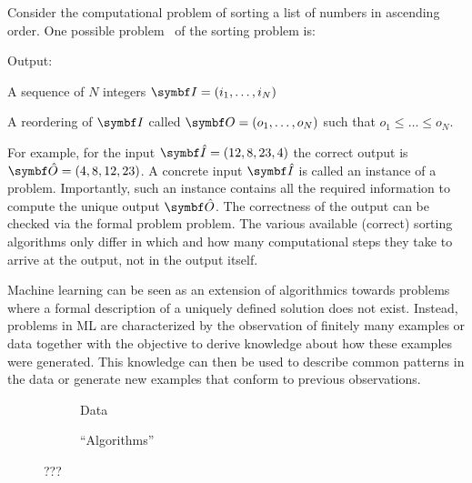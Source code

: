 Consider the computational problem of sorting a list of numbers in ascending order.
One possible problem~\parencite{cormen_introduction_2009} of the sorting problem is:
\begin{problem}[Sorting]
\label{prob:bayesian_ml:sorting}
\begin{labeling}{Output:}
    \item[Input:] A sequence of $N$ integers $\mat{I} = (i_1, \dots, i_N)$
    \item[Output:] A reordering of $\mat{I}$ called $\mat{O} = (o_1, \dots, o_N)$ such that $o_1 \leq \dots \leq o_N$.
\end{labeling}
\end{problem}
For example, for the input $\mat{\hat{I}}=(12, 8, 23, 4)$ the correct output is $\mat{\hat{O}}=(4, 8, 12, 23)$.
A concrete input $\mat{\hat{I}}$ is called an instance of a problem.
Importantly, such an instance contains all the required information to compute the unique output $\mat{\hat{O}}$.
The correctness of the output can be checked via the formal problem problem.
The various available (correct) sorting algorithms only differ in which and how many computational steps they take to arrive at the output, not in the output itself.

Machine learning can be seen as an extension of algorithmics towards problems where a formal description of a uniquely defined solution does not exist.
Instead, problems in ML are characterized by the observation of finitely many examples or data together with the objective to derive knowledge about how these examples were generated.
This knowledge can then be used to describe common patterns in the data or generate new examples that conform to previous observations.

\begin{figure}[t]
    \begin{subfigure}[b]{\halffigurewidth}
        \centering
        \caption{
            Data
            \label{fig:bayesian_ml:polynoms:data}
        }
    \end{subfigure}
    \hfill
    \begin{subfigure}[b]{\halffigurewidth}
        \centering
        \caption{
            \enquote{Algorithms}
            \label{fig:bayesian_ml:polynoms:lagrange}
        }
    \end{subfigure}
    \caption[Algorithmic Interpolation]{
        ???
        \label{fig:bayesian_ml:polynoms:ml}
    }
\end{figure}

